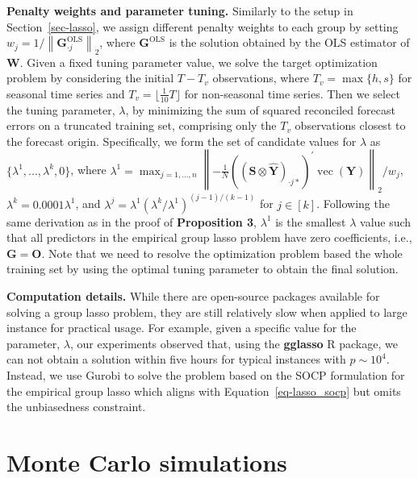 \documentclass[11pt,a4paper,]{article}
\begin{document}
\textbf{Penalty weights and parameter tuning.} Similarly to the setup in
Section~\ref{sec-lasso}, we assign different penalty weights to each
group by setting
\(w_j = 1/\left\|\boldsymbol{G}_{\cdot j}^{\text{OLS}}\right\|_2\),
where \(\boldsymbol{G}^{\text{OLS}}\) is the solution obtained by the
OLS estimator of \(\boldsymbol{W}\). Given a fixed tuning parameter
value, we solve the target optimization problem by considering the
initial \(T-T_v\) observations, where \(T_v = \max\{h, s\}\) for
seasonal time series and \(T_v = \lfloor \frac{1}{10}T \rfloor\) for
non-seasonal time series. Then we select the tuning parameter,
\(\lambda\), by minimizing the sum of squared reconciled forecast errors
on a truncated training set, comprising only the \(T_v\) observations
closest to the forecast origin. Specifically, we form the set of
candidate values for \(\lambda\) as
\(\{\lambda^{1},...,\lambda^{k}, 0\}\), where
\(\lambda^{1} = \max _{j=1, \ldots, n}\left\|-\frac{1}{N}\left(\left(\boldsymbol{S} \otimes \hat{\boldsymbol{Y}}\right)_{\cdot j*}\right)^{\prime} \operatorname{vec}(\boldsymbol{Y})\right\|_2 / w_j\),
\(\lambda^{k} = 0.0001\lambda^{1}\), and
\(\lambda^{j} = \lambda^{1}\left(\lambda^{k} / \lambda^{1}\right)^{(j-1) / (k-1)}\)
for \(j \in [k]\). Following the same derivation as in the proof of
\textbf{Proposition 3}, \(\lambda^{1}\) is the smallest \(\lambda\)
value such that all predictors in the empirical group lasso problem have
zero coefficients, i.e., \(\boldsymbol{G} = \boldsymbol{O}\). Note that
we need to resolve the optimization problem based the whole training set
by using the optimal tuning parameter to obtain the final solution.

\textbf{Computation details.} While there are open-source packages
available for solving a group lasso problem, they are still relatively
slow when applied to large instance for practical usage. For example,
given a specific value for the parameter, \(\lambda\), our experiments
observed that, using the \textbf{gglasso} R package, we can not obtain a
solution within five hours for typical instances with \(p \sim 10^4\).
Instead, we use Gurobi to solve the problem based on the SOCP
formulation for the empirical group lasso which aligns with
Equation~\ref{eq-lasso_socp} but omits the unbiasedness constraint.

\hypertarget{sec-simulations}{%
\section{Monte Carlo simulations}\label{sec-simulations}}
\end{document}
